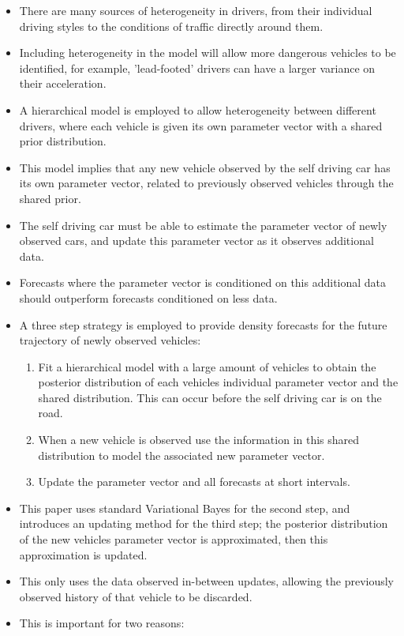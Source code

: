 \documentclass[12pt,a4paper]{article}\usepackage[]{graphicx}\usepackage[]{color}
\begin{document}
\begin{itemize}
\item There are many sources of heterogeneity in drivers, from their individual driving styles to the conditions of traffic directly around them.
\item Including heterogeneity in the model will allow more dangerous vehicles to be identified, for example, 'lead-footed' drivers can have a larger variance on their acceleration.
\item A hierarchical model is employed to allow heterogeneity between different drivers, where each vehicle is given its own parameter vector with a shared prior distribution.
\item This model implies that any new vehicle observed by the self driving car has its own parameter vector, related to previously observed vehicles through the shared prior.
\item The self driving car must be able to estimate the parameter vector of newly observed cars, and update this parameter vector as it observes additional data.
\item Forecasts where the parameter vector is conditioned on this additional data should outperform forecasts conditioned on less data.
\item A three step strategy is employed to provide density forecasts for the future trajectory of newly observed vehicles:
\begin{enumerate}
\item Fit a hierarchical model with a large amount of vehicles to obtain the posterior distribution of each vehicles individual parameter vector and the shared distribution. This can occur before the self driving car is on the road.
\item When a new vehicle is observed use the information in this shared distribution to model the associated new parameter vector. 
\item Update the parameter vector and all forecasts at short intervals.
\end{enumerate}
\item This paper uses standard Variational Bayes for the second step, and introduces an updating method for the third step; the posterior distribution of the new vehicles parameter vector is approximated, then this approximation is updated.
\item This only uses the data observed in-between updates, allowing the previously observed history of that vehicle to be discarded.
\item This is important for two reasons:
\begin{enumerate}

\end{enumerate}
\end{itemize}
\end{document}
